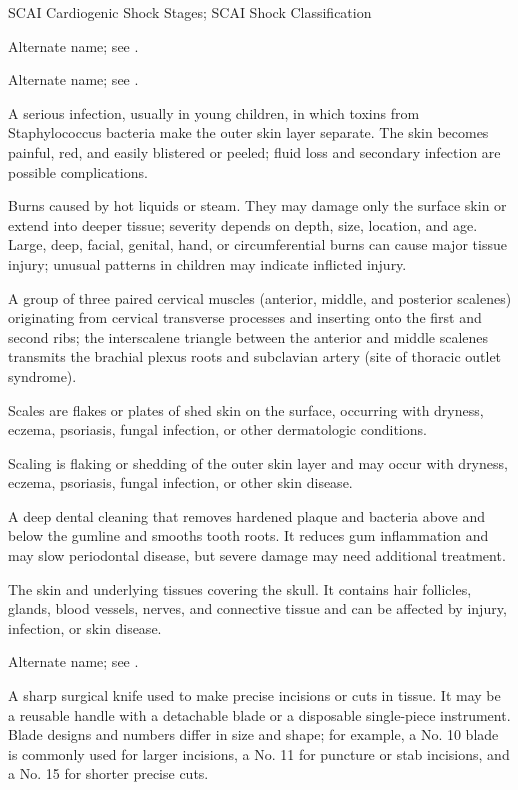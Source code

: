 \synonyms
SCAI Cardiogenic Shock Stages; SCAI Shock Classification

 Alternate name; see .

 Alternate name; see .

 A serious infection, usually in young children, in which toxins from Staphylococcus bacteria make the outer skin layer separate. The skin becomes painful, red, and easily blistered or peeled; fluid loss and secondary infection are possible complications.

 Burns caused by hot liquids or steam. They may damage only the surface skin or extend into deeper tissue; severity depends on depth, size, location, and age. Large, deep, facial, genital, hand, or circumferential burns can cause major tissue injury; unusual patterns in children may indicate inflicted injury.

 A group of three paired cervical muscles (anterior, middle, and posterior scalenes) originating from cervical transverse processes and inserting onto the first and second ribs; the interscalene triangle between the anterior and middle scalenes transmits the brachial plexus roots and subclavian artery (site of thoracic outlet syndrome).

 Scales are flakes or plates of shed skin on the surface, occurring with dryness, eczema, psoriasis, fungal infection, or other dermatologic conditions.

 Scaling is flaking or shedding of the outer skin layer and may occur with dryness, eczema, psoriasis, fungal infection, or other skin disease.

 A deep dental cleaning that removes hardened plaque and bacteria above and below the gumline and smooths tooth roots. It reduces gum inflammation and may slow periodontal disease, but severe damage may need additional treatment.

 The skin and underlying tissues covering the skull. It contains hair follicles, glands, blood vessels, nerves, and connective tissue and can be affected by injury, infection, or skin disease.

 Alternate name; see .

 A sharp surgical knife used to make precise incisions or cuts in tissue. It may be a reusable handle with a detachable blade or a disposable single-piece instrument. Blade designs and numbers differ in size and shape; for example, a No. 10 blade is commonly used for larger incisions, a No. 11 for puncture or stab incisions, and a No. 15 for shorter precise cuts.


